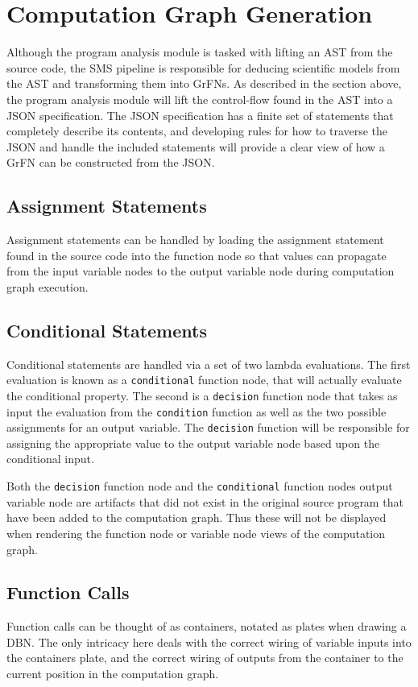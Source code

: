 \section{Computation Graph Generation\label{sec:cg_gen}}
Although the program analysis module is tasked with lifting an AST from the source code, the SMS pipeline is responsible for deducing scientific models from the AST and transforming them into GrFNs. As described in the section above, the program analysis module will lift the control-flow found in the AST into a JSON specification. The JSON specification has a finite set of statements that completely describe its contents, and developing rules for how to traverse the JSON and handle the included statements will provide a clear view of how a GrFN can be constructed from the JSON.

\subsection{Assignment Statements\label{sec:assg_stmts}}
Assignment statements can be handled by loading the assignment statement found in the source code into the function node so that values can propagate from the input variable nodes to the output variable node during computation graph execution.

\subsection{Conditional Statements\label{sec:cond_stmts}}
Conditional statements are handled via a set of two lambda evaluations. The first evaluation is known as a \texttt{conditional} function node, that will actually evaluate the conditional property. The second is a \texttt{decision} function node that takes as input the evaluation from the \texttt{condition} function as well as the two possible assignments for an output variable. The \texttt{decision} function will be responsible for assigning the appropriate value to the output variable node based upon the conditional input.

Both the \texttt{decision} function node and the \texttt{conditional} function nodes output variable node are artifacts that did not exist in the original source program that have been added to the computation graph. Thus these will not be displayed when rendering the function node or variable node views of the computation graph.

\subsection{Function Calls\label{sec:func_calls}}
Function calls can be thought of as containers, notated as plates when drawing a DBN. The only intricacy here deals with the correct wiring of variable inputs into the containers plate, and the correct wiring of outputs from the container to the current position in the computation graph.

